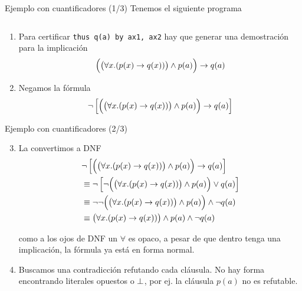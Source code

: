 \documentclass[xcolor={dvipsnames},spanish]{beamer}
\begin{document}
\begin{frame}{Ejemplo con cuantificadores (1/3)}
    Tenemos el siguiente programa

    \begin{figure}[H]
        \centering
        \begin{tabular}{c}
            
        \end{tabular}
    \end{figure}

    \begin{enumerate}
        \item Para certificar \lstinline{thus q(a) by ax1, ax2} hay que generar una
        demostración para la implicación \[
            \Big(\big(\forall x. (p(x) \to q(x))\big) \wedge p(a) \Big)
            \to q(a)
        \]
        \item Negamos la fórmula 
        \[
            \neg \left[
            \Big(\big(\forall x. (p(x) \to q(x))\big) \wedge p(a) \Big)
            \to q(a)
        \right]
        \]
    \end{enumerate}
\end{frame}

\begin{frame}{Ejemplo con cuantificadores (2/3)}
    \begin{enumerate}
        \setcounter{enumi}{2}
        \item La convertimos a DNF
        \begin{align*}
            &\neg \left[
                \Big(\big(\forall x. (p(x) \to q(x))\big) \wedge p(a) \Big)
                \to q(a)
            \right] \\
            &\equiv \neg \left[
                \neg \Big(\big(\forall x. (p(x) \to q(x))\big) \wedge p(a) \Big)
                \vee q(a)
            \right] \\
            &\equiv
                \neg \neg \Big(\big(\forall x. (p(x) \to q(x))\big) \wedge p(a) \Big)
                \wedge \neg q(a)\\
            &\equiv \big(\forall x. (p(x) \to q(x))\big) \wedge p(a)
            \wedge \neg q(a)
        \end{align*}

        como a los ojos de DNF un $\forall$ es opaco, a pesar de que dentro
        tenga una implicación, la fórmula ya está en forma normal.

        \item Buscamos una contradicción refutando cada cláusula. No hay forma
        encontrando literales opuestos o $\bot$, por ej. la cláusula
        $p(a)$ no es refutable.
    \end{enumerate}
\end{frame}
\end{document}
